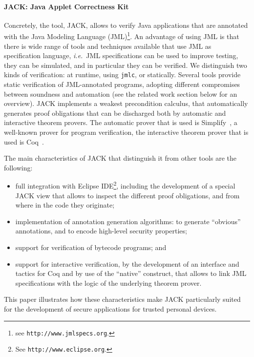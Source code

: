 \paragraph{JACK: Java Applet Correctness Kit}
Concretely, the tool, JACK, allows to verify Java applications that
are annotated with the Java Modeling Language (JML)\footnote{see
\texttt{http://www.jmlspecs.org}.}. An advantage of using JML is that
there is wide range of tools and techniques available that use JML as
specification language,
\emph{i.e.}\ JML specifications can be used to improve testing, they
can be simulated, and in particular they can be verified. We
distinguish two kinds of verification: at runtime, using
\texttt{jmlc}, or statically. Several tools provide
static verification of JML-annotated programs, adopting different
compromises between soundness and automation (see the related work
section below for an overview).  JACK implements a weakest
precondition calculus, that automatically generates proof obligations
that can be discharged both by automatic and interactive theorem
provers. The automatic prover that is used is Simplify~\cite{}, a
well-known prover for program verification, the interactive theorem
prover that is used is Coq~\cite{}.


The main characteristics of JACK that distinguish it from other tools
are the following:
\begin{itemize}
\item full integration with Eclipse IDE\footnote{See
\texttt{http://www.eclipse.org}.}, including the development of a
special JACK view that allows to inspect the different proof
obligations, and from where in the code they originate;
\item implementation of annotation generation algorithms: to
generate ``obvious'' annotations, and to encode high-level security
properties;
\item support for verification of bytecode programs; and
\item support for interactive verification, by the development of an interface
and tactics for Coq and by use of the ``native'' construct, that allows to
link JML specifications with the logic of the underlying theorem
prover. 
\end{itemize}
This paper illustrates how these characteristics make JACK
particularly suited for the development of secure applications for
trusted personal devices.

